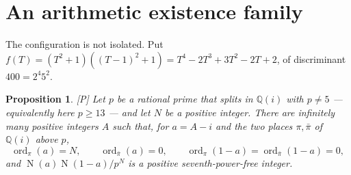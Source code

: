 \documentclass[11pt]{article}
\theoremstyle{plain}
\newtheorem{proposition}[theorem]{Proposition}
\theoremstyle{definition}
\newcommand{\ord}{\operatorname{ord}}
\newcommand{\Norm}{\operatorname{N}}
\begin{document}
\section{An arithmetic existence family}\label{s:family}

The configuration is not isolated.  Put
$f(T)=(T^2+1)((T-1)^2+1)=T^4-2T^3+3T^2-2T+2$, of discriminant
$400=2^4 5^2$.

\begin{proposition}\label{p:family}
\textup{[P]} Let $p$ be a rational prime that splits in $\mathbb{Q}(i)$ with
$p\ne5$ --- equivalently here $p\ge13$ --- and let $N$ be a positive integer.  There are infinitely many positive integers $A$ such that,
for $a=A-i$ and the two places $\pi,\bar\pi$ of $\mathbb{Q}(i)$ above $p$,
\[
 \ord_\pi(a)=N,\qquad \ord_{\bar\pi}(a)=0,\qquad
 \ord_\pi(1-a)=\ord_{\bar\pi}(1-a)=0,
\]
and $\Norm(a)\Norm(1-a)/p^N$ is a positive seventh-power-free integer.
\end{proposition}
\end{document}
